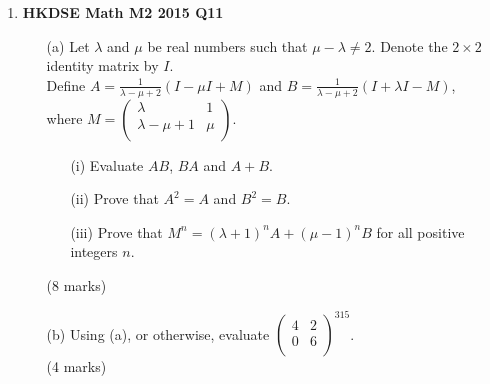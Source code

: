 \documentclass{report}
\begin{document}
\begin{enumerate}
	\item \textbf{HKDSE Math M2 2015 Q11}
	\begin{enumerate}
		\item [(a)]Let $\lambda$ and $\mu$ be real numbers such that $\mu - \lambda \neq 2$. Denote the $2 \times 2$ identity matrix by $I$.\\Define $\displaystyle A = \frac{1}{\lambda - \mu + 2} (I - \mu I + M)$ and $\displaystyle B = \frac{1}{\lambda - \mu + 2} (I +\lambda  I - M)$, \\where $M = \begin{pmatrix}
			\lambda & 1 \\ \lambda - \mu + 1 & \mu \\
		\end{pmatrix}$. 
		\begin{enumerate}
			\item [(i)]Evaluate $AB$, $BA$ and $A+B$. 
			\item [(ii)]Prove that $A^2 = A$ and $B^2 = B$. 
			\item [(iii)]Prove that $M^n = (\lambda + 1)^nA + (\mu -1)^n B$ for all positive integers $n$.
		\end{enumerate}
		(8 marks)
		\item [(b)]Using (a), or otherwise, evaluate $\begin{pmatrix}
			4&2\\0&6\\
		\end{pmatrix}^{315}$. \\(4 marks)
	\end{enumerate}
	

\end{enumerate}
\end{document}
